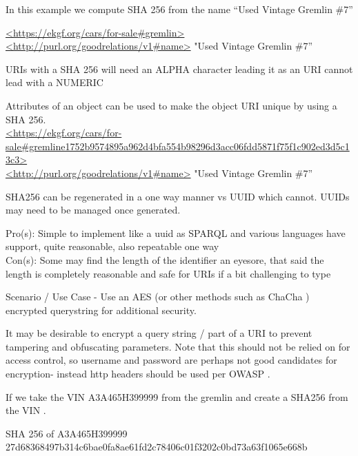 In this example we compute SHA 256 from the name “Used Vintage Gremlin \#7”

    {\footnotesize\url{<https://ekgf.org/cars/for-sale#gremlin>} \\ \url{<http://purl.org/goodrelations/v1#name>} "Used Vintage Gremlin \#7”}

URIs with a SHA 256 will need an ALPHA character leading it as an URI cannot lead with a NUMERIC

Attributes of an object can be used to make the object URI unique  by using a SHA 256. \\
    {\footnotesize\url{<https://ekgf.org/cars/for-sale#gremline1752b9574895a962d4bfa554b98296d3acc06fdd5871f75f1c902ed3d5c13c3>}  \\ \url{<http://purl.org/goodrelations/v1#name>} "Used Vintage Gremlin \#7”}

SHA256 can be regenerated in a one way manner vs UUID which cannot.
UUIDs may need to  be managed once generated.

Pro(s): Simple to implement like a uuid as SPARQL and various languages have support, quite reasonable, also
repeatable one way \\
Con(s): Some may find the length of the identifier an eyesore, that said the length is completely reasonable and safe
for URIs if a bit challenging to type


Scenario / Use Case -
Use an AES (or other methods such as ChaCha ) encrypted querystring for additional security.

It may be desirable to encrypt a query string / part of a URI to prevent tampering and obfuscating parameters.
Note that this should not be relied on for access control, so username and password are perhaps not good candidates
for encryption- instead http headers should be used per OWASP .

If we take the VIN A3A465H399999 from the gremlin and create a SHA256 from the VIN .

SHA 256 of A3A465H399999 \\

{\footnotesize 27d68368497b314c6bae0fa8ae61fd2c78406c01f3202c0bd73a63f1065e668b }

